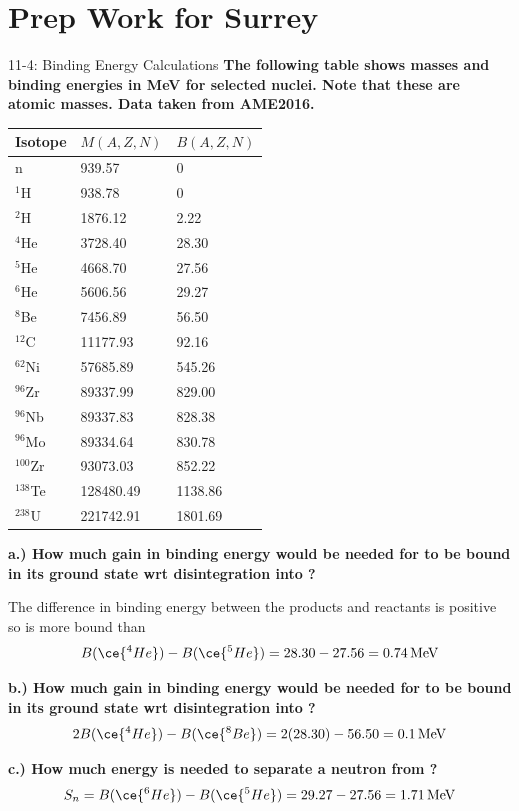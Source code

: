 \section{Prep Work for Surrey}
\begin{example}{1}{1-4: Binding Energy Calculations}
\textbf{The following table shows masses and binding energies in MeV for selected nuclei. Note that these are atomic masses. Data taken from AME2016.}
\begin{center}
\begin{tabular}{lll}
\toprule
{Isotope} & {$M(A,Z,N)$} & {$B(A,Z,N)$} \\
\midrule
n                   & 939.57    & 0       \\
$^{1}$H             & 938.78    & 0       \\
$^{2}$H             & 1876.12   & 2.22    \\
$^{4}$He            & 3728.40   & 28.30   \\
$^{5}$He            & 4668.70   & 27.56   \\
$^{6}$He            & 5606.56   & 29.27   \\
$^{8}$Be            & 7456.89   & 56.50   \\
$^{12}$C            & 11177.93  & 92.16   \\
$^{62}$Ni           & 57685.89  & 545.26  \\
$^{96}$Zr           & 89337.99  & 829.00  \\
$^{96}$Nb           & 89337.83  & 828.38  \\
$^{96}$Mo           & 89334.64  & 830.78  \\
$^{100}$Zr          & 93073.03  & 852.22  \\
$^{138}$Te          & 128480.49 & 1138.86 \\
$^{238}$U           & 221742.91 & 1801.69 \\
\bottomrule
\end{tabular}
\end{center}
\textbf{a.) How much gain in binding energy would be needed for  to be bound in its ground state wrt disintegration into ?}

The difference in binding energy between the products and reactants is positive so  is more bound than 
\[B(\ce{^4{He}}) - B(\ce{^5{He}}) = 28.30-27.56=0.74\,\text{MeV}\]

\vspace{-1em}
\textbf{b.) How much gain in binding energy would be needed for  to be bound in its ground state wrt disintegration into ?}
\[2B(\ce{^4{He}}) - B(\ce{^8{Be}}) = 2(28.30)-56.50=0.1\,\text{MeV}\]

\vspace{-1em}
\textbf{c.) How much energy is needed to separate a neutron from ?}
\[S_n = B(\ce{^6He})-B(\ce{^5He})=29.27-27.56=1.71\,\text{MeV}\]
\end{example}


